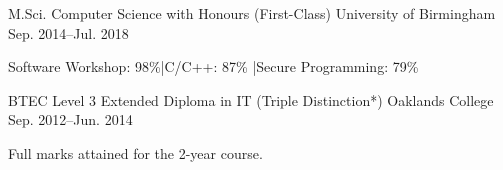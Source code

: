 

\begin{cventries}

  \cventry
  {M.Sci. Computer Science with Honours (First-Class)} %
    {University of Birmingham} %
    {} %
    {Sep. 2014--Jul. 2018} %
    {
      \begin{cvitems}
      \item {Software Workshop: 98\%\hspace*{3mm}|\hspace*{3mm}C/C++: 87\%
        \hspace*{3mm}|\hspace*{3mm}Secure Programming: 79\%}
      \end{cvitems}
    }

  \cventry
  {BTEC Level 3 Extended Diploma in IT (Triple Distinction*)} %
    {Oaklands College} %
    {} %
    {Sep. 2012--Jun. 2014} %
    {
      \begin{cvitems} %
        \item {Full marks attained for the 2-year course.}
      \end{cvitems}
    }

\end{cventries}
